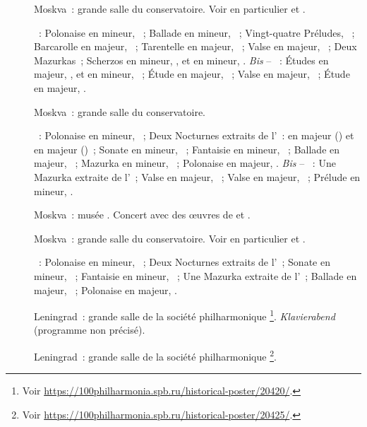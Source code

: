 \begin{description}
 \item[]
 Moskva~: grande salle du conservatoire.
 Voir en particulier \citet[p.~442]{Milshteyn82a} et
 \citet[p.~394]{Nikonovich08}.

 \textsc{\Chopin{}}~: Polonaise en \kC \Sharp mineur,  ~;
 Ballade en \kG mineur, ~; Vingt-quatre Préludes, ~;
 Barcarolle en \kF \Sharp majeur, ~; Tarentelle en \kA \Flat
 majeur, ~; Valse  en \kA \Flat majeur, 
 ~; Deux Mazurkas~; Scherzos en \kB mineur, , et en \kB
 \Flat mineur, .
 \emph{Bis} -- \textsc{\Chopin{}}~: Études en \kG \Flat majeur, 
 , et en \kC \Sharp mineur,  ~; Étude en \kF
 majeur,  ~; Valse  en \kA \Flat majeur,
  ~; Étude en \kF majeur,  .
 \item[]
 Moskva~: grande salle du conservatoire.

 \textsc{\Chopin{}}~: Polonaise en \kC \Sharp mineur,  ~;
 Deux Nocturnes extraits de l'~: en \kF \Sharp majeur ()
 et en \kF majeur ()~; Sonate en \kB \Flat mineur, ~;
 Fantaisie en \kF mineur, ~; Ballade en \kA \Flat majeur,
 ~; Mazurka en \kC \Sharp mineur,  ~; Polonaise
 en \kA \Flat majeur, .
 \emph{Bis} -- \textsc{\Chopin{}}~: Une Mazurka extraite de l'~;
 Valse  en \kG \Flat majeur,  ~; Valse
  en \kD \Flat majeur,  ~; Prélude en \kD
 mineur,  .
 \item[]
 Moskva~: musée \Scriabine{}.
 Concert avec des œuvres de \Chopin{} et \Scriabine{}.
 \item[]
 Moskva~: grande salle du conservatoire.
 Voir en particulier \citet[p.~442]{Milshteyn82a} et
 \citet[p.~394]{Nikonovich08}.

 \textsc{\Chopin{}}~: Polonaise en \kC \Sharp mineur,  ~;
 Deux Nocturnes extraits de l'~; Sonate en \kB \Flat mineur,
 ~; Fantaisie en \kF mineur, ~; Une Mazurka extraite de
 l'~; Ballade en \kA \Flat majeur, ~; Polonaise en \kA
 \Flat majeur, .
 \item[]
 Leningrad~: grande salle de la société philharmonique%
 \footnote{Voir
 \href{https://100philharmonia.spb.ru/historical-poster/20420/}%
 {https://100philharmonia.spb.ru/historical-poster/20420/}.}.
 \foreignlanguage{german}{\emph{Klavierabend}} (programme non précisé).
 \item[]
 Leningrad~: grande salle de la société philharmonique%
 \footnote{Voir
 \href{https://100philharmonia.spb.ru/historical-poster/20425/}%
 {https://100philharmonia.spb.ru/historical-poster/20425/}.}.


\end{description}
